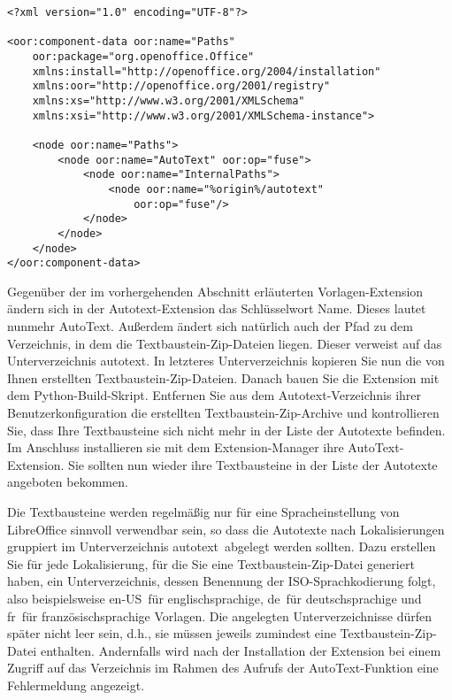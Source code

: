 \documentclass[a4paper,10pt,pagesize,titlepage]{scrbook}
\begin{document}
\begin{lstlisting}
<?xml version="1.0" encoding="UTF-8"?>

<oor:component-data oor:name="Paths" 
    oor:package="org.openoffice.Office" 
    xmlns:install="http://openoffice.org/2004/installation" 
    xmlns:oor="http://openoffice.org/2001/registry"
    xmlns:xs="http://www.w3.org/2001/XMLSchema" 
    xmlns:xsi="http://www.w3.org/2001/XMLSchema-instance">

    <node oor:name="Paths">
        <node oor:name="AutoText" oor:op="fuse">
            <node oor:name="InternalPaths">
                <node oor:name="%origin%/autotext" 
                    oor:op="fuse"/>
            </node>
        </node>
    </node>
</oor:component-data>
\end{lstlisting}

Gegenüber der im vorhergehenden Abschnitt erläuterten Vorlagen-Extension ändern sich in der Autotext-Extension das Schlüsselwort Name. Dieses lautet nunmehr \glqq AutoText\grqq. Außerdem ändert sich natürlich auch der Pfad zu dem Verzeichnis, in dem die Textbaustein-Zip-Dateien liegen. Dieser verweist auf das Unterverzeichnis \glqq autotext\grqq. In letzteres Unterverzeichnis kopieren Sie nun die von Ihnen erstellten Textbaustein-Zip-Dateien. Danach bauen Sie die Extension mit dem Python-Build-Skript. Entfernen Sie aus dem Autotext-Verzeichnis ihrer Benutzerkonfiguration die erstellten Textbaustein-Zip-Archive und kontrollieren Sie, dass Ihre Textbausteine sich nicht mehr in der Liste der Autotexte befinden. Im Anschluss installieren sie mit dem Extension-Manager ihre AutoText-Extension. Sie sollten nun wieder ihre Textbausteine in der Liste der Autotexte angeboten bekommen.

Die Textbausteine werden regelmäßig nur für eine Spracheinstellung von LibreOffice sinnvoll verwendbar sein, so dass die Autotexte nach Lokalisierungen gruppiert im Unterverzeichnis \glqq autotext\grqq~abgelegt werden sollten. Dazu erstellen Sie für jede Lokalisierung, für die Sie eine Textbaustein-Zip-Datei generiert haben, ein Unterverzeichnis, dessen Benennung der ISO-Sprachkodierung folgt, also  beispielsweise \glqq en-US\grqq~für englischsprachige, \glqq de\grqq~für deutschsprachige und \glqq fr\grqq~für französischsprachige Vorlagen. Die angelegten Unterverzeichnisse dürfen später nicht leer sein, d.h., sie müssen jeweils zumindest eine Textbaustein-Zip-Datei enthalten. Andernfalls wird nach der Installation der Extension bei einem Zugriff auf das Verzeichnis im Rahmen des Aufrufs der AutoText-Funktion eine Fehlermeldung angezeigt.
\end{document}
